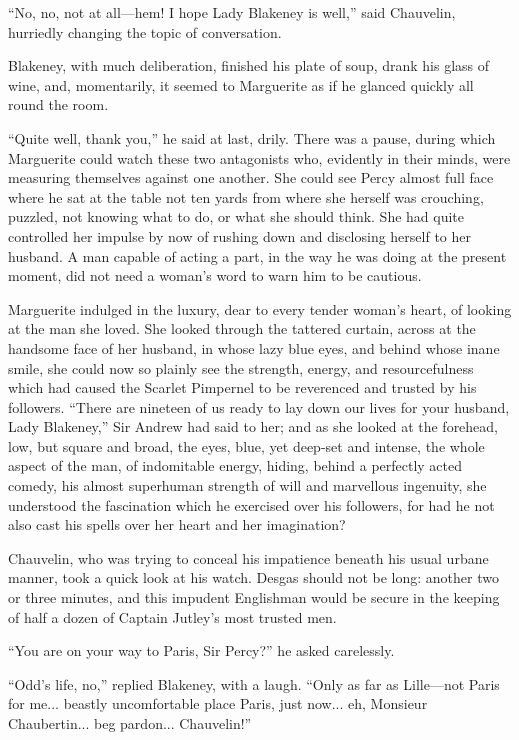 \documentclass[paper=a5,BCOR=7mm,twoside,DIV=calc,12pt,usegeometry,chapterprefix,endperiod,headings=big]{scrbook}
\begin{document}
\enquote{No, no, not at all---hem! I hope Lady Blakeney is well,} said Chauvelin, hurriedly changing the topic of conversation.

Blakeney, with much deliberation, finished his plate of soup, drank his glass of wine, and, momentarily, it seemed to Marguerite as if he glanced quickly all round the room.

\enquote{Quite well, thank you,} he said at last, drily. There was a pause, during which Marguerite could watch these two antagonists who, evidently in their minds, were measuring themselves against one another. She could see Percy almost full face where he sat at the table not ten yards from where she herself was crouching, puzzled, not knowing what to do, or what she should think. She had quite controlled her impulse by now of rushing down and disclosing herself to her husband. A man capable of acting a part, in the way he was doing at the present moment, did not need a woman's word to warn him to be cautious.

Marguerite indulged in the luxury, dear to every tender woman's heart, of looking at the man she loved. She looked through the tattered curtain, across at the handsome face of her husband, in whose lazy blue eyes, and behind whose inane smile, she could now so plainly see the strength, energy, and resourcefulness which had caused the Scarlet Pimpernel to be reverenced and trusted by his followers. \enquote{There are nineteen of us ready to lay down our lives for your husband, Lady Blakeney,} Sir Andrew had said to her; and as she looked at the forehead, low, but square and broad, the eyes, blue, yet deep-set and intense, the whole aspect of the man, of indomitable energy, hiding, behind a perfectly acted comedy, his almost superhuman strength of will and marvellous ingenuity, she understood the fascination which he exercised over his followers, for had he not also cast his spells over her heart and her imagination?

Chauvelin, who was trying to conceal his impatience beneath his usual urbane manner, took a quick look at his watch. Desgas should not be long: another two or three minutes, and this impudent Englishman would be secure in the keeping of half a dozen of Captain Jutley's most trusted men.

\enquote{You are on your way to Paris, Sir Percy?} he asked carelessly.

\enquote{Odd's life, no,} replied Blakeney, with a laugh. \enquote{Only as far as Lille---not Paris for me... beastly uncomfortable place Paris, just now... eh, Monsieur Chaubertin... beg pardon... Chauvelin!}
\end{document}
